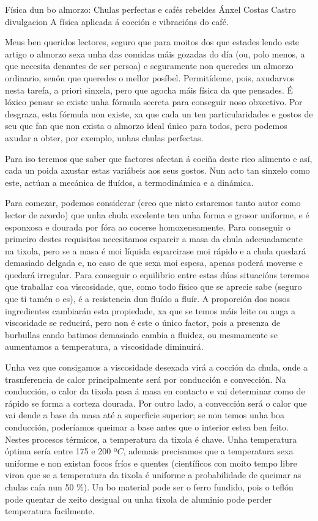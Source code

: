 \Titular%
{Física dun bo almorzo: Chulas perfectas e cafés rebeldes}
{Ánxel Costas Castro}
{divulgacion}
{A física aplicada á cocción e vibracións do café.}


\begin{multicols}{2}

Meus ben queridos lectores, seguro que para moitos dos que estades lendo este
artigo o almorzo sexa unha das comidas máis gozadas do día (ou, polo menos, a
que necesita denantes de ser persoa) e seguramente non queredes un almorzo
ordinario, senón que queredes o mellor posíbel. Permitídeme, pois, axudarvos
nesta tarefa, a priori sinxela, pero que agocha máis física da que pensades. É
lóxico pensar se existe unha fórmula secreta para conseguir noso obxectivo. Por
desgraza, esta fórmula non existe, xa que cada un ten particularidades e gostos
de seu que fan que non exista o almorzo ideal único para todos, pero podemos
axudar a obter, por exemplo, unhas chulas perfectas.

Para iso teremos que saber que factores afectan á cociña deste rico alimento e
así, cada un poida axustar estas variábeis aos seus gostos. Nun acto tan
sinxelo como este, actúan a mecánica de fluídos, a termodinámica e a dinámica.

Para comezar, podemos considerar (creo que nisto estaremos tanto autor como
lector de acordo) que unha chula excelente ten unha forma e grosor uniforme, e
é esponxosa e dourada por fóra ao cocerse homoxeneamente. Para conseguir o
primeiro destes requisitos necesitamos esparcir a masa da chula adecuadamente
na tixola, pero se a masa é moi líquida esparcirase moi rápido e a chula
quedará demasiado delgada e, no caso de que sexa moi espesa, apenas poderá
moverse e quedará irregular. Para conseguir o equilibrio entre estas dúas
situacións teremos que traballar coa viscosidade, que, como todo físico que se
aprecie sabe (seguro que ti tamén o es), é a resistencia dun fluído a fluír. A
proporción dos nosos ingredientes cambiarán esta propiedade, xa que se temos
máis leite ou auga a viscosidade se reducirá, pero non é este o único factor,
pois a presenza de burbullas cando batimos demasiado cambia a fluidez, ou
mesmamente se aumentamos a temperatura, a viscosidade diminuirá.

Unha vez que consigamos a viscosidade desexada virá a cocción da chula, onde a
trasnferencia de calor principalmente será por conducción e convección. Na
conducción, o calor da tixola pasa á masa en contacto e vai determinar como de
rápido se forma a corteza dourada. Por outro lado, a convección será o calor
que vai dende a base da masa até a superficie superior; se non temos unha boa
conducción, poderíamos queimar a base antes que o interior estea ben feito.
Nestes procesos térmicos, a temperatura da tixola é chave. Unha temperatura
óptima sería entre 175 e 200 º$C$, ademais precisamos que a temperatura sexa
uniforme e non existan focos fríos e quentes (científicos con moito tempo libre
viron que se a temperatura da tixola é uniforme a probabilidade de queimar as
chulas caía nun 50 \%). Un bo material pode ser o ferro fundido, pois o teflón
pode quentar de xeito desigual ou unha tixola de aluminio pode perder
temperatura facilmente.


\end{multicols}
